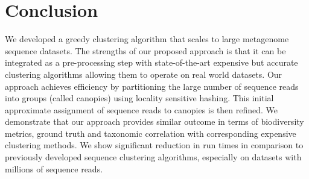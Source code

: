 \documentclass[10pt, conference, compsocconf]{IEEEtran}
\begin{document}
\section{Conclusion}
\label{sec:Conclusion}

We developed a greedy clustering algorithm 
that scales to large metagenome sequence datasets. The strengths of our proposed approach is that it can be integrated as a pre-processing step
with state-of-the-art expensive but accurate clustering algorithms allowing them to
operate on real world datasets. 
%
Our approach 
achieves efficiency 
by  
partitioning the large number of sequence reads into 
groups (called canopies) using locality sensitive 
hashing.  This 
initial approximate assignment of sequence reads to 
canopies is then 
refined. We demonstrate that our 
approach provides similar outcome in terms of biodiversity metrics, ground truth and taxonomic correlation with corresponding expensive clustering methods.
%
We show significant reduction in run times in comparison to previously developed sequence 
clustering algorithms, especially on datasets with millions of sequence reads.








\end{document}
